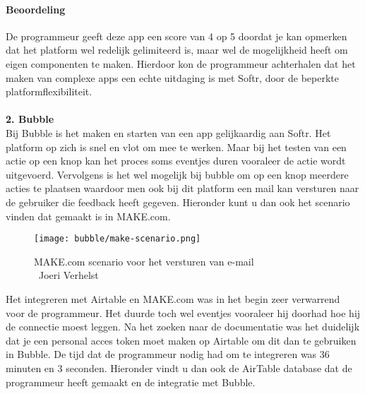\paragraph*{Beoordeling}
De programmeur geeft deze app een score van 4 op 5 doordat je kan opmerken dat het platform wel redelijk gelimiteerd is, maar wel de mogelijkheid heeft om eigen componenten te maken. 
Hierdoor kon de programmeur achterhalen dat het maken van complexe apps een echte uitdaging is met Softr, 
door de beperkte platformflexibiliteit.
\\
\\
\textbf{2. Bubble}
\\
Bij Bubble is het maken en starten van een app gelijkaardig aan Softr. Het platform op zich is snel en vlot om mee te werken. Maar bij het testen van een actie op een knop
kan het proces soms eventjes duren vooraleer de actie wordt uitgevoerd. Vervolgens is het wel mogelijk bij bubble om op een knop meerdere acties te plaatsen waardoor men ook 
bij dit platform een mail kan versturen naar de gebruiker die feedback heeft gegeven. Hieronder kunt u dan ook het scenario vinden dat gemaakt is in MAKE.com.
\\
\begin{figure}[H]
    \texttt{[image: bubble/make-scenario.png]}
    \caption[MAKE.com scenario voor het versturen van e-mail]{MAKE.com scenario voor het versturen van e-mail\\\textcopyright\ Joeri Verhelst}
    \label{fig:make-scenario-bubble}
\end{figure}
Het integreren met Airtable en MAKE.com was in het begin zeer verwarrend voor de programmeur. Het duurde toch wel eventjes vooraleer hij doorhad hoe hij de connectie moest leggen.
Na het zoeken naar de documentatie was het duidelijk dat je een personal acces token moet maken op Airtable om dit dan te gebruiken in Bubble. De tijd dat de programmeur nodig had 
om te integreren was 36 minuten en 3 seconden. Hieronder vindt u dan ook de AirTable database dat de programmeur heeft gemaakt en de integratie met Bubble.
\\
\\


